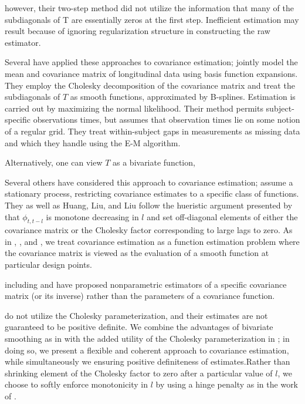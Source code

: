 \documentclass[12pt]{article}
\theoremstyle{definition}
\begin{document}
{{{{however, their two-step method did not utilize the information that many of the subdiagonals of T are essentially zeros at the first step. Inefficient estimation may result because of ignoring regularization structure in constructing the raw estimator. 

\bigskip

Several have applied these approaches to covariance estimation; \citet{huang2007estimation} jointly model the mean and covariance matrix of longitudinal data using basis function expansions. They employ the Cholesky decomposition of the covariance matrix and treat the subdiagonals of $T$ as smooth functions, approximated by B-splines. Estimation is carried out by maximizing the normal likelihood. Their method permits subject-specific observations times, but assumes that observation times lie on some notion of a regular grid. They treat within-subject gaps in measurements as missing data and which they handle using the E-M algorithm. 

\bigskip

Alternatively, one can view $T$ as a bivariate function,

Several others have considered this approach to covariance estimation; \citet{kaufman2008covariance} assume a stationary process, restricting covariance estimates to a specific class of functions.  They as well as  Huang, Liu, and Liu \citet{huang2007estimation} follow the hueristic argument presented by \citet{pourahmadi1999joint} that $\phi_{t,t-l}$ is monotone decreasing in $l$ and set off-diagonal elements of either the covariance matrix or the Cholesky factor corresponding to large lags to zero.   As in \citet{huang2007estimation}, \citet{kaufman2008covariance}, and \citet{yao2005functional}, we treat covariance estimation as a function estimation problem where the covariance matrix is viewed as the evaluation of a smooth function at particular design points. 

including \citet{bickel2008regularized} and \citet{huang2006covariance}  have proposed nonparametric estimators of a specific covariance matrix (or its inverse) rather than the parameters of a covariance function. 

\bigskip

\citet{yao2005functional} do not utilize the Cholesky parameterization, and their estimates are not guaranteed to be positive definite.  We combine the advantages of bivariate smoothing as in \citet{yao2005functional} with the added utility of the Cholesky parameterization in \citet{huang2007estimation}; in doing so, we present a flexible and coherent approach to covariance estimation, while simultaneously we ensuring positive definiteness of estimates.Rather than shrinking element of the Cholesky factor to zero after a particular value of $l$, we choose to softly enforce monotonicity in $l$ by using a hinge penalty as in the work of \citet{tibshirani2011nearly}. 

}}}}
\end{document}
